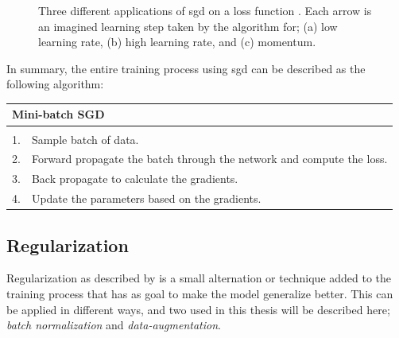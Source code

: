     \begin{figure}[H]
        \centering

        
        \caption[Learning rates]{Three different applications of \gls{sgd} on a loss function . Each arrow is an imagined learning step taken by the algorithm for; (a) low learning rate, (b) high learning rate, and (c) momentum.}
      	\medskip 
        \label{learning_rates}
    \end{figure}

    In summary, the entire training process using \gls{sgd} can be described as the following algorithm\cite{farsal2018deep}:
    
    \begin{longtable}{lllllll} \label{sgd algorithm}\\
    \hline
    \multicolumn{7}{l}{Mini-batch SGD}                                                              \\ \hline
    \endfirsthead
    \endhead
    \hline
    \endfoot
    \endlastfoot
    \multicolumn{7}{l}{Loop:}                                                                       \\
    1.   & \multicolumn{6}{l}{Sample batch of data.}                                                \\
    2.   & \multicolumn{6}{l}{Forward propagate the batch through the network and compute the loss.} \\
    3.   & \multicolumn{6}{l}{Back propagate to calculate the gradients.}                            \\
    4.   & \multicolumn{6}{l}{Update the parameters based on the gradients.}                         \\ \hline
    \end{longtable}
    
    

    
\subsection{Regularization}
    Regularization as described by \citeauthor{kukavcka2017_regularization}\cite{kukavcka2017_regularization} is a small alternation or technique added to the training process that has as goal to make the model generalize better. This can be applied in different ways, and two used in this thesis will be described here; \textit{batch normalization} and \textit{data-augmentation}.
    
